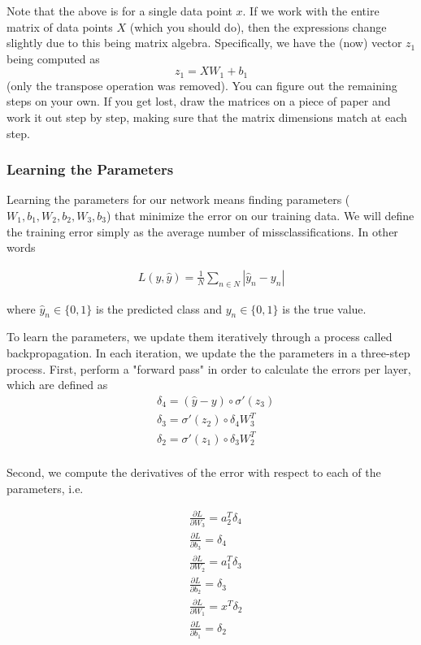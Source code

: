 \documentclass[11pt]{article}
\begin{document}
Note that the above is for a single data point \(x\). If we work with
the entire matrix of data points \(X\) (which you should do), then the
expressions change slightly due to this being matrix algebra.
Specifically, we have the (now) vector \(z_1\) being computed as \[
z_1 = XW_1 + b_1
\] (only the transpose operation was removed). You can figure out the
remaining steps on your own. If you get lost, draw the matrices on a
piece of paper and work it out step by step, making sure that the matrix
dimensions match at each step.

    \subsubsection{Learning the Parameters}\label{learning-the-parameters}

Learning the parameters for our network means finding parameters
(\(W_1, b_1, W_2, b_2, W_3, b_3\)) that minimize the error on our
training data. We will define the training error simply as the average
number of missclassifications. In other words

\[
\begin{aligned}
L(y,\hat{y}) = \frac{1}{N} \sum_{n \in N} | \hat{y}_n - y_{n} |
\end{aligned}
\]

    where \(\hat{y}_n \in \{0, 1\}\) is the predicted class and
\(y_n \in \{0, 1\}\) is the true value.

To learn the parameters, we update them iteratively through a process
called backpropagation. In each iteration, we update the the parameters
in a three-step process. First, perform a "forward pass" in order to
calculate the errors per layer, which are defined as \[
\begin{aligned}
& \delta_4 = (\hat{y} - y) \circ \sigma'(z_3)\\
& \delta_3 = \sigma'(z_2) \circ \delta_4W_3^T \\
& \delta_2 = \sigma'(z_1) \circ \delta_3W_2^T \\
\end{aligned}
\]

    Second, we compute the derivatives of the error with respect to each of
the parameters, i.e.

    \[
\begin{aligned}
& \frac{\partial{L}}{\partial{W_3}} = a_2^T \delta_4  \\
& \frac{\partial{L}}{\partial{b_3}} = \delta_4\\
& \frac{\partial{L}}{\partial{W_2}} = a_1^T \delta_3  \\
& \frac{\partial{L}}{\partial{b_2}} = \delta_3\\
& \frac{\partial{L}}{\partial{W_1}} = x^T \delta_2\\
& \frac{\partial{L}}{\partial{b_1}} = \delta_2 \\
\end{aligned}
\]
\end{document}
